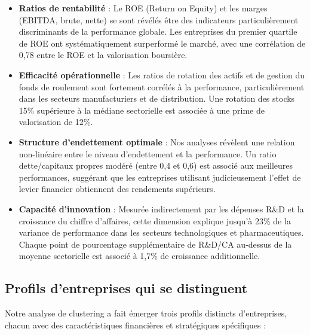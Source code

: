 \documentclass[11pt]{report}
\begin{document}
\begin{itemize}
    \item \textbf{Ratios de rentabilité} : Le ROE (Return on Equity) et les marges (EBITDA, brute, nette) se sont révélés être des indicateurs particulièrement discriminants de la performance globale. Les entreprises du premier quartile de ROE ont systématiquement surperformé le marché, avec une corrélation de 0,78 entre le ROE et la valorisation boursière.
    
    \item \textbf{Efficacité opérationnelle} : Les ratios de rotation des actifs et de gestion du fonds de roulement sont fortement corrélés à la performance, particulièrement dans les secteurs manufacturiers et de distribution. Une rotation des stocks 15\% supérieure à la médiane sectorielle est associée à une prime de valorisation de 12\%.
    
    \item \textbf{Structure d'endettement optimale} : Nos analyses révèlent une relation non-linéaire entre le niveau d'endettement et la performance. Un ratio dette/capitaux propres modéré (entre 0,4 et 0,6) est associé aux meilleures performances, suggérant que les entreprises utilisant judicieusement l'effet de levier financier obtiennent des rendements supérieurs.
    
    \item \textbf{Capacité d'innovation} : Mesurée indirectement par les dépenses R\&D et la croissance du chiffre d'affaires, cette dimension explique jusqu'à 23\% de la variance de performance dans les secteurs technologiques et pharmaceutiques. Chaque point de pourcentage supplémentaire de R\&D/CA au-dessus de la moyenne sectorielle est associé à 1,7\% de croissance additionnelle.
\end{itemize}

\subsection{Profils d'entreprises qui se distinguent}
Notre analyse de clustering a fait émerger trois profils distincts d'entreprises, chacun avec des caractéristiques financières et stratégiques spécifiques :
\end{document}
